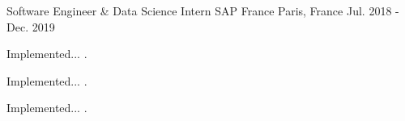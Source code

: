 \begin{cventries}
  \cventry
    {Software Engineer \& Data Science Intern}
    {SAP France}
    {Paris, France}
    {Jul. 2018 - Dec. 2019}
    {
      \begin{cvitems}
        \item {Implemented... .}
        \item {Implemented... .}
        \item {Implemented... .}
      \end{cvitems}
    }
\end{cventries}

